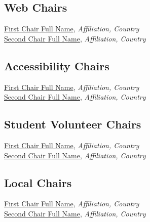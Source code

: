 \subsection{Web Chairs}
\href{https://orcid.org/0000-0001-2345-6789}{First Chair Full Name}, \emph{Affiliation, Country}\\
\href{https://orcid.org/0000-0001-2345-6789}{Second Chair Full Name}, \emph{Affiliation, Country}\\

\subsection{Accessibility Chairs}
\href{https://orcid.org/0000-0001-2345-6789}{First Chair Full Name}, \emph{Affiliation, Country}\\
\href{https://orcid.org/0000-0001-2345-6789}{Second Chair Full Name}, \emph{Affiliation, Country}\\

\subsection{Student Volunteer Chairs}
\href{https://orcid.org/0000-0001-2345-6789}{First Chair Full Name}, \emph{Affiliation, Country}\\
\href{https://orcid.org/0000-0001-2345-6789}{Second Chair Full Name}, \emph{Affiliation, Country}\\

\subsection{Local Chairs}
\href{https://orcid.org/0000-0001-2345-6789}{First Chair Full Name}, \emph{Affiliation, Country}\\
\href{https://orcid.org/0000-0001-2345-6789}{Second Chair Full Name}, \emph{Affiliation, Country}\\